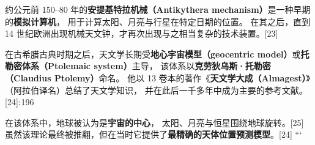约公元前 150–80 年的\textbf{安提基特拉机械（Antikythera mechanism）}是一种早期的\textbf{模拟计算机}，  
用于计算太阳、月亮与行星在特定日期的位置。  
在其之后，直到 14 世纪欧洲出现机械天文钟，才再次出现与之相当复杂的技术装置。[23]  

在古希腊古典时期之后，天文学长期受\textbf{地心宇宙模型（geocentric model）}或\textbf{托勒密体系（Ptolemaic system）}主导，  
该体系以\textbf{克劳狄乌斯·托勒密（Claudius Ptolemy）}命名。  
他以 13 卷本的著作《\textbf{天文学大成（Almagest）}》（阿拉伯译名）总结了天文学知识，  
并在此后一千多年中成为主要的参考文献。[24]: 196   

在该体系中，地球被认为是\textbf{宇宙的中心}，  
太阳、月亮与恒星围绕地球旋转。[25]  
虽然该理论最终被推翻，但在当时它提供了\textbf{最精确的天体位置预测模型}。[24]
```
